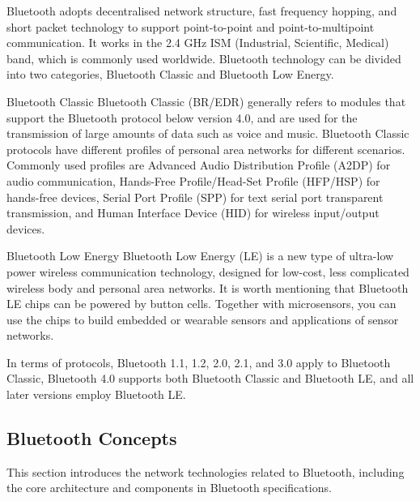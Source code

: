 \documentclass[a4paper,12pt]{book}
\begin{document}

Bluetooth adopts decentralised network structure, fast frequency hopping, and short packet technology to support point-to-point and point-to-multipoint communication. It works in the 2.4 GHz ISM (Industrial, Scientific, Medical) band, which is commonly used worldwide. Bluetooth technology can be divided into two categories, Bluetooth Classic and Bluetooth Low Energy.

\begin{term}{Bluetooth Classic}
    Bluetooth Classic (BR/EDR) generally refers to modules that support the Bluetooth protocol below version 4.0, and are used for the transmission of large amounts of data such as voice and music. Bluetooth Classic protocols have different profiles of personal area networks for different scenarios. Commonly used profiles are Advanced Audio Distribution Profile (A2DP) for audio communication, Hands-Free Profile/Head-Set Profile (HFP/HSP) for hands-free devices, Serial Port Profile (SPP) for text serial port transparent transmission, and Human Interface Device (HID) for wireless input/output devices.
\end{term}

\begin{term}{Bluetooth Low Energy}
    Bluetooth Low Energy (LE) is a new type of ultra-low power wireless communication technology, designed for low-cost, less complicated wireless body and personal area networks. It is worth mentioning that Bluetooth LE chips can be powered by button cells. Together with microsensors, you can use the chips to build embedded or wearable sensors and applications of sensor networks.
\end{term}

In terms of protocols, Bluetooth 1.1, 1.2, 2.0, 2.1, and 3.0 apply to Bluetooth Classic, Bluetooth 4.0 supports both Bluetooth Classic and Bluetooth LE, and all later versions employ Bluetooth LE.

\subsection{Bluetooth Concepts}
This section introduces the network technologies related to Bluetooth, including the core architecture and components in Bluetooth specifications.
\end{document}
